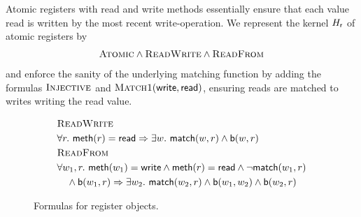 \begin{example}

  Atomic registers with {\sf read} and {\sf write} methods essentially ensure
  that each value read is written by the most recent {\sc write}-operation.
  We represent the kernel $H_{\sf r}$ of atomic registers by
  \begin{align*}
    \textsc{Atomic} \land \textsc{ReadWrite} \land \textsc{ReadFrom}
  \end{align*}
  and enforce the sanity of the underlying matching function by adding the
  formulas $\textsc{Injective}$ and $\textsc{Match1}({\sf write},{\sf read})$,
  ensuring reads are matched to writes writing the read value.

\end{example}

\begin{figure}

  \footnotesize
  \begin{align*}
    & \textsc{ReadWrite} \\
    & \forall r.\ {\sf meth}(r) = {\sf read} \implies \exists w.\ {\sf match}(w,r) \land {\sf b}(w,r)
    \\
    & \textsc{ReadFrom} \\
    & \forall w_1, r.\ {\sf meth}(w_1) = {\sf write} \land {\sf meth}(r) = {\sf read} \land \neg {\sf match}(w_1,r) \\
    & \quad \land {\sf b}(w_1,r) \implies \exists w_2.\ {\sf match}(w_2,r) \land {\sf b}(w_1,w_2) \land {\sf b}(w_2,r)
  \end{align*}

  \caption{Formulas for register objects.}
  \label{fig:formulas:register}

\end{figure}

